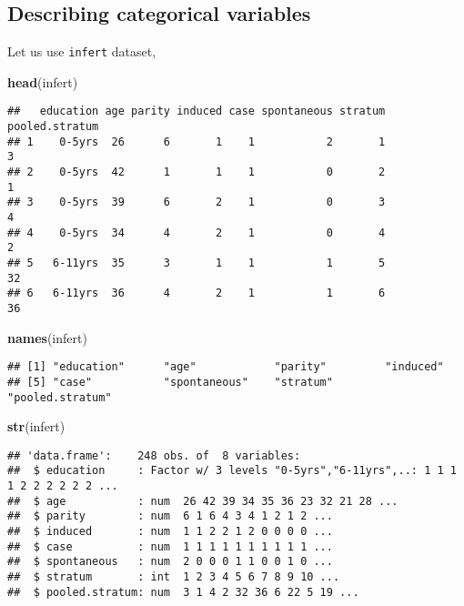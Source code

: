 \documentclass[]{book}
\newenvironment{Shaded}{\begin{snugshade}}{\end{snugshade}}
\newcommand{\KeywordTok}[1]{\textcolor[rgb]{0.13,0.29,0.53}{\textbf{#1}}}
\newcommand{\NormalTok}[1]{#1}
\theoremstyle{definition}
\theoremstyle{definition}
\theoremstyle{remark}
\begin{document}
\subsection{Describing categorical
variables}\label{describing-categorical-variables}

Let us use \texttt{infert} dataset,

\begin{Shaded}
\begin{Highlighting}[]
\KeywordTok{head}\NormalTok{(infert)}
\end{Highlighting}
\end{Shaded}

\begin{verbatim}
##   education age parity induced case spontaneous stratum pooled.stratum
## 1    0-5yrs  26      6       1    1           2       1              3
## 2    0-5yrs  42      1       1    1           0       2              1
## 3    0-5yrs  39      6       2    1           0       3              4
## 4    0-5yrs  34      4       2    1           0       4              2
## 5   6-11yrs  35      3       1    1           1       5             32
## 6   6-11yrs  36      4       2    1           1       6             36
\end{verbatim}

\begin{Shaded}
\begin{Highlighting}[]
\KeywordTok{names}\NormalTok{(infert)}
\end{Highlighting}
\end{Shaded}

\begin{verbatim}
## [1] "education"      "age"            "parity"         "induced"       
## [5] "case"           "spontaneous"    "stratum"        "pooled.stratum"
\end{verbatim}

\begin{Shaded}
\begin{Highlighting}[]
\KeywordTok{str}\NormalTok{(infert)}
\end{Highlighting}
\end{Shaded}

\begin{verbatim}
## 'data.frame':    248 obs. of  8 variables:
##  $ education     : Factor w/ 3 levels "0-5yrs","6-11yrs",..: 1 1 1 1 2 2 2 2 2 2 ...
##  $ age           : num  26 42 39 34 35 36 23 32 21 28 ...
##  $ parity        : num  6 1 6 4 3 4 1 2 1 2 ...
##  $ induced       : num  1 1 2 2 1 2 0 0 0 0 ...
##  $ case          : num  1 1 1 1 1 1 1 1 1 1 ...
##  $ spontaneous   : num  2 0 0 0 1 1 0 0 1 0 ...
##  $ stratum       : int  1 2 3 4 5 6 7 8 9 10 ...
##  $ pooled.stratum: num  3 1 4 2 32 36 6 22 5 19 ...
\end{verbatim}
\end{document}
